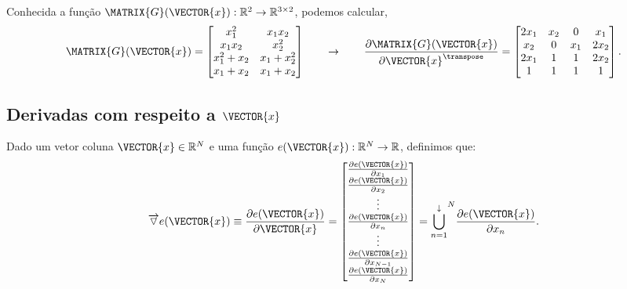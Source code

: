 \begin{example}
Conhecida a função $\MATRIX{G}(\VECTOR{x}): \mathbb{R}^2 \rightarrow \mathbb{R}^{3 \times 2}$, podemos calcular,
\begin{equation}
\MATRIX{G}(\VECTOR{x})=
\begin{bmatrix}
x_1^2       & x_1 x_2\\
x_1 x_2     & x_2^2\\
x_1^2 + x_2 & x_1 + x_2^2\\
x_1 + x_2   & x_1 + x_2
\end{bmatrix}
\qquad \rightarrow \qquad
\frac{\partial \MATRIX{G}(\VECTOR{x}) }{\partial \VECTOR{x}^{\transpose}}= 
\begin{bmatrix}
2 x_1 & x_2 & 0   &   x_1\\
  x_2 & 0   & x_1 & 2 x_2\\
2 x_1 & 1   & 1   & 2 x_2\\
    1 & 1   & 1   & 1
\end{bmatrix}.
\end{equation}
\end{example}
\subsection{Derivadas com respeito a $\VECTOR{x}$}

\begin{definition}\label{def:deltaver}
Dado 
um vetor coluna $\VECTOR{x}\in \mathbb{R}^N$ e 
uma função $e(\VECTOR{x}): \mathbb{R}^N \rightarrow \mathbb{R}$,
definimos que:
\begin{equation}
\overrightarrow{\triangledown} e(\VECTOR{x}) \equiv 
\frac{\partial e(\VECTOR{x}) }{\partial \VECTOR{x}}= 
\left[
\begin{matrix}
\frac{\partial e(\VECTOR{x}) }{\partial x_{1}} \\
\frac{\partial e(\VECTOR{x}) }{\partial x_{2}} \\
\vdots \\
\frac{\partial e(\VECTOR{x}) }{\partial x_{n}} \\
\vdots \\
\frac{\partial e(\VECTOR{x}) }{\partial x_{N-1}} \\
\frac{\partial e(\VECTOR{x}) }{\partial x_{N}} 
\end{matrix}
\right] = 
{\bigcup\limits_{n=1}^{\downarrow}}^{N}{\frac{\partial e(\VECTOR{x}) }{\partial x_{n}}}. 
\end{equation}
\end{definition}

